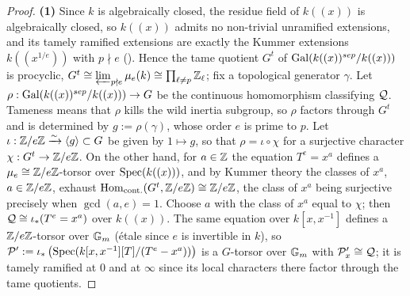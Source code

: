 \begin{proof}
    \textbf{(1)} Since $k$ is algebraically closed, the residue field of $k((x))$ is algebraically closed, so $k((x))$
    admits no non-trivial unramified extensions, and its tamely ramified extensions are exactly the Kummer extensions
    $k((x^{1/e}))$ with $p \nmid e$ (). Hence the tame quotient $G^t$ of
    $\operatorname{Gal}(k((x))^{sep}/k((x)))$ is procyclic, $G^t \cong \varprojlim_{p \nmid e} \mu_e(k) \cong \prod_{\ell \neq p} \mathbb{Z}_\ell$;
    fix a topological generator $\gamma$.
    Let $\rho: \operatorname{Gal}(k((x))^{sep}/k((x))) \to G$ be the continuous homomorphism classifying $\mathcal{Q}$. Tameness means that
    $\rho$ kills the wild inertia subgroup, so $\rho$ factors through $G^t$ and is determined by $g := \rho(\gamma)$, whose
    order $e$ is prime to $p$. Let $\iota: \mathbb{Z}/e\mathbb{Z} \xrightarrow{\sim} \langle g \rangle \subset G$ be given by
    $1 \mapsto g$, so that $\rho = \iota \circ \chi$ for a surjective character $\chi : G^t \to \mathbb{Z}/e\mathbb{Z}$.
    On the other hand, for $a \in \mathbb{Z}$ the equation $T^e = x^a$ defines a $\mu_e \cong \mathbb{Z}/e\mathbb{Z}$-torsor over
    $\operatorname{Spec}(k((x)))$, and by Kummer theory the classes of $x^a$, $a \in \mathbb{Z}/e\mathbb{Z}$, exhaust
    $\mathrm{Hom}_{\mathrm{cont.}}(G^t, \mathbb{Z}/e\mathbb{Z}) \cong \mathbb{Z}/e\mathbb{Z}$, the class of $x^a$ being surjective precisely when
    $\gcd(a, e) = 1$. Choose $a$ with the class of $x^a$ equal to $\chi$; then $\mathcal{Q} \cong \iota_*(T^e = x^a)$ over
    $k((x))$. The same equation over $k[x, x^{-1}]$ defines a $\mathbb{Z}/e\mathbb{Z}$-torsor over $\mathbb{G}_m$ (étale since $e$ is invertible
    in $k$), so $\mathcal{P}' := \iota_*\left(\operatorname{Spec}(k[x,x^{-1}][T]/(T^e - x^a))\right)$ is a $G$-torsor over $\mathbb{G}_m$ with
    $\mathcal{P}'_x \cong \mathcal{Q}$; it is tamely ramified at $0$ and at $\infty$ since its local characters there factor through the
    tame quotients.


\end{proof}
